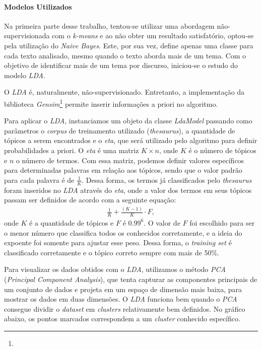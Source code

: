 \paragraph{Modelos Utilizados}

Na primeira parte desse trabalho, tentou-se utilizar uma abordagem não-supervisionada com o \textit{k-means} e ao não obter um resultado satisfatório, optou-se pela utilização do \textit{Naive Bayes}. Este, por sua vez, define apenas uma classe para cada texto analisado, mesmo quando o texto aborda mais de um tema. Com o objetivo de identificar mais de um tema por discurso, iniciou-se o estudo do modelo \textit{LDA}.

O \textit{LDA} é, naturalmente, não-supervisionado. Entretanto, a implementação da biblioteca \textit{Gensim}\footnote{} permite inserir informações a priori no algoritmo.

Para aplicar o \textit{LDA}, instanciamos um objeto da classe \textit{LdaModel} passando como parâmetros o \textit{corpus} de treinamento utilizado (\textit{thesaurus}), a quantidade de tópicos a serem encontrados e o \textit{eta}, que será utilizado pelo algoritmo para definir probabilidades a priori. O \textit{eta} é uma matriz \(K \times n\), onde \(K\) é o número de tópicos e \(n\) o número de termos. Com essa matriz, podemos definir valores específicos para determinadas palavras em relação aos tópicos, sendo que o valor padrão para cada palavra é de \(\frac{1}{K}\). Dessa forma, os termos já classificados pelo \textit{thesaurus} foram inseridos no \textit{LDA} através do \textit{eta}, onde a valor dos termos em seus tópicos passam ser definidos de acordo com a seguinte equação:
\begin{align}
  \frac{1}{K}+\frac{(K-1)}{K} \cdot F,
\end{align}
onde \(K\) é a quantidade de tópicos e \(F\) é \(0.99^6\). O valor de \(F\) foi escolhido para ser o menor número que classifica todos os conhecidos corretamente, e a ideia do expoente foi somente para ajustar esse peso. Dessa forma, o \textit{training set} é classificado corretamente e o tópico correto sempre com mais de 50\%.

Para visualizar os dados obtidos com o \textit{LDA}, utilizamos o método \textit{PCA} (\textit{Principal Component Analysis}), que tenta capturar as componentes principais de um conjunto de dados e projeta em um espaço de dimensão mais baixa, para mostrar os dados em duas dimensões. O \textit{LDA} funciona bem quando o \textit{PCA} consegue dividir o \textit{dataset} em \textit{clusters} relativamente bem definidos. No gráfico abaixo, os pontos marcados correspondem a um \textit{cluster} conhecido específico.

